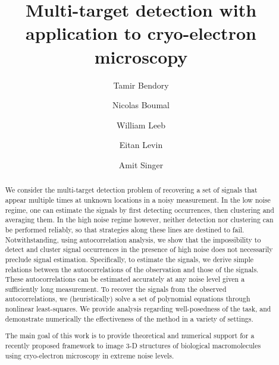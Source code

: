 \documentclass[12pt]{article}
\newcommand{\1}{\mathbf{1}}
\theoremstyle{plain}
\theoremstyle{definition}
\theoremstyle{remark}
\theoremstyle{plain}
\theoremstyle{remark}
\theoremstyle{plain}
\theoremstyle{plain}
\theoremstyle{plain}
\numberwithin{equation}{section}
\begin{document}


\title{Multi-target detection with application to cryo-electron microscopy}

\author[a]{Tamir Bendory}
\author[b]{Nicolas Boumal} 
\author[c]{William Leeb}
\author[a,b]{Eitan Levin}
\author[a,b]{Amit Singer}


\maketitle



\begin{abstract}

We consider the multi-target detection problem of recovering a set of signals that appear 
multiple times at unknown locations in a noisy measurement.
In the low noise regime, one can estimate the signals by first detecting occurrences, then clustering and averaging them.
In the high noise regime however, neither detection nor clustering can be performed reliably, so that strategies along these lines are destined to fail.  
Notwithstanding, using autocorrelation analysis, we show that the impossibility to detect and cluster signal occurrences in the presence of high noise does not necessarily preclude signal estimation.
Specifically, to estimate the signals, we derive simple relations between the autocorrelations of the observation and those of the signals. These autocorrelations can be estimated accurately at any noise level given a sufficiently long measurement. 
To recover the signals from the observed autocorrelations, we (heuristically) solve a set of polynomial equations through nonlinear least-squares. 
We provide analysis regarding well-posedness of the task, and demonstrate numerically the effectiveness of the method in a variety of settings.

The main goal of this work is to provide theoretical and numerical support for a recently proposed framework to image 3-D structures of biological macromolecules using cryo-electron microscopy in extreme noise levels. %
 
\end{abstract}
\end{document}
